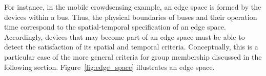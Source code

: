 For instance, in the mobile crowdsensing example, an edge space is formed by the devices within a bus. Thus, the physical boundaries of buses and their operation time correspond to the spatial-temporal specification of an edge space. Accordingly, devices that may become part of an edge space must be able to detect the satisfaction of its spatial and temporal criteria. Conceptually, this is a particular case of the more general criteria for group membership discussed in the following section. Figure~\ref{fig:edge_space} illustrates an edge space.











